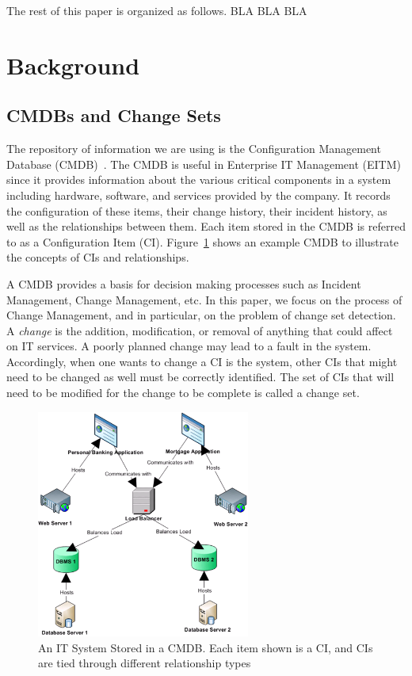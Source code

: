 \documentclass{article}
\begin{document}
The rest of this paper is organized as follows. BLA BLA BLA


\section{Background}

\subsection{CMDBs and Change Sets}
The repository of information we are using is the Configuration Management Database (CMDB)~\cite{itil}. The CMDB is useful in Enterprise IT Management (EITM)
since it provides information about the various critical components in a system including hardware, software, and services provided by the company. It records
the configuration of these items, their change history, their incident history, as well as the relationships between them. Each item stored in the CMDB is
referred to as a Configuration Item (CI). Figure~\ref{fig:cmdbExample} shows an example CMDB to illustrate the concepts of CIs and relationships.

A CMDB provides a basis for decision making processes such as Incident Management, Change Management, etc.  In this paper, we focus on the process of Change
Management, and in particular, on the problem of change set detection. A \textit{change} is the addition, modification, or removal of anything that could affect
on IT services. A poorly planned change may lead to a fault in the system. Accordingly, when one wants to change a CI is the system, other CIs that might
need to be changed as well must be correctly identified. The set of CIs that will need to be modified for the change to be complete is called a change set.

\begin{figure}[!t]
\centering
\includegraphics[width=7cm]{cmdbExample.PNG}
\caption{An IT System Stored in a CMDB. Each item shown is a CI, and CIs are tied through different relationship types}
\label{fig:cmdbExample}
\end{figure}
\end{document}

